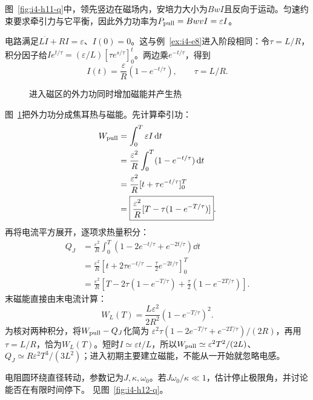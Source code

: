 \begin{solution}
图~\ref{fig:i4-h11-q}中，领先竖边在磁场内，安培力大小为$BwI$且反向于运动。匀速约束要求牵引力与它平衡，因此外力功率为$P_{\rm pull}=BwvI=\varepsilon I$。

电路满足$L\dot I+RI=\varepsilon$、$I(0)=0$。这与例~\ref{ex:i4-e8}进入阶段相同：令$\tau=L/R$，积分因子给$I e^{t/\tau}=(\varepsilon/L)[\tau e^{s/\tau}]_0^t$。两边乘$e^{-t/\tau}$，得到
\[
I(t)=\frac{\varepsilon}{R}(1-e^{-t/\tau}),\qquad \tau=L/R.
\]
\begin{figure}[H]\centering
{}
\caption{进入磁区的外力功同时增加磁能并产生热}\label{fig:i4-h11-s}
\end{figure}
图~\ref{fig:i4-h11-s}把外力功分成焦耳热与磁能。先计算牵引功：
\[
\begin{aligned}
W_{\rm pull}&=\int_0^T\varepsilon I\mathop{}\!\mathrm d t\\
&=\frac{\varepsilon^2}{R}\int_0^T(1-e^{-t/\tau})\mathop{}\!\mathrm d t\\
&=\frac{\varepsilon^2}{R}[t+\tau e^{-t/\tau}]_0^T\\
&=\boxed{\frac{\varepsilon^2}{R}
[T-\tau(1-e^{-T/\tau})]}.
\end{aligned}
\]
再将电流平方展开，逐项求热量积分：
\[
\begin{aligned}
Q_J&=\frac{\varepsilon^2}{R}
\int_0^T(1-2e^{-t/\tau}+e^{-2t/\tau})\dd t\\
&=\frac{\varepsilon^2}{R}\left[t+2\tau e^{-t/\tau}-\frac\tau2e^{-2t/\tau}\right]_0^T\\
&=\boxed{\frac{\varepsilon^2}{R}
\left[T-2\tau(1-e^{-T/\tau})
+\frac\tau2(1-e^{-2T/\tau})\right]}.
\end{aligned}
\]
末磁能直接由末电流计算：
\[
\boxed{W_L(T)=\frac{L\varepsilon^2}{2R^2}(1-e^{-T/\tau})^2}.
\]
为核对两种积分，将$W_{\rm pull}-Q_J$化简为
$\varepsilon^2\tau(1-2e^{-T/\tau}+e^{-2T/\tau})/(2R)$，再用$\tau=L/R$，恰为$W_L(T)$。短时$I\simeq\varepsilon t/L$，所以$W_{\rm pull}\simeq\varepsilon^2T^2/(2L)$、$Q_J\simeq R\varepsilon^2T^3/(3L^2)$；进入初期主要建立磁能，不能从一开始就忽略电感。
\end{solution}

\begin{exercise}[强阻尼圆环的小转角极限]\label{ex:i4-h12}
电阻圆环绕直径转动，参数记为$J,\kappa,\omega_0$。若$J\omega_0/\kappa\ll1$，估计停止极限角，并讨论能否在有限时间停下。 见图~\ref{fig:i4-h12-q}。
\end{exercise}

